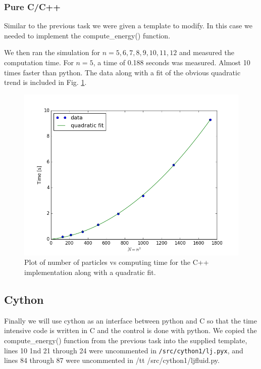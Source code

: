 \documentclass[11pt,a4paper]{scrartcl}
\makeatletter
\newcommand{\listfile}[6]{
}
\makeatother
\begin{document}
\subsubsection{Pure C/C++}
Similar to the previous task we were given a template to modify. In this case we needed to implement the compute\_energy() function.
 \listfile{../src/ljfluid.cpp}{/src/ljfluid.cpp}{73}{91}{Compute Energy}{computeenergy}
We then ran the simulation for $n = {5,6,7,8,9,10,11,12}$ and measured the computation time. For $n=5$, a time of 0.188 seconds was measured. Almost 10 times faster than python. The data along with a fit of the obvious quadratic trend is included in Fig. \ref{fig:cpp}.
\begin{figure}[h]
\includegraphics[width=0.7\linewidth]{../fig/fit.png}
  \centering
  \caption{Plot of number of particles vs computing time for the C++ implementation along with a quadratic fit.}
\label{fig:cpp}
\end{figure}
\subsection{Cython}
Finally we will use cython as an interface between python and C so that the time intensive code is written in C and the control is done with python. We copied the compute\_energy() function from the previous task into the supplied template, lines 10 1nd 21 through 24 were uncommented in {\tt /src/cython1/lj.pyx}, and lines 84 through 87 were uncommented in {/tt /src/cython1/ljfluid.py}.
\end{document}
